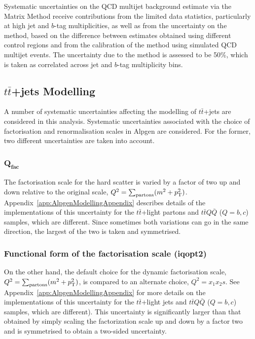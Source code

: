 Systematic uncertainties on the QCD multijet background 
estimate via the Matrix Method receive
contributions from the limited data statistics, 
particularly at high jet and $b$-tag multiplicities, as
well as from the uncertainty on the method, based on 
the difference between estimates obtained using 
different control regions and from the calibration 
of the method using simulated QCD multijet events.
The uncertainty due to the method is assessed to be 
50\%, which is taken as correlated across jet
and $b$-tag multiplicity bins. 




\subsection{$t\bar{t}$+jets Modelling}
\label{sec:syst_ttbarmodelHTX}

A number of systematic uncertainties affecting 
the modelling of $t\bar{t}$+jets are considered
in this analysis. Systematic uncertainties associated 
with the choice of factorisation and renormalisation 
scales in {\sc Alpgen} are considered. For the former, 
two different uncertainties are taken into account.
\subsubsection*{$\mathbf{Q_{fac}}$}
The factorisation scale for the hard scatter is varied by a factor of two up and down relative to the
original scale, $Q^2=\sum_{\rm partons} (m^2 + \pt^2)$.
\ifIsINT 
Appendix~\ref{app:AlpgenModellingAppendix} describes details of the
implementations of this uncertainty for the $t\bar{t}$+light partons and $t\bar{t}Q\bar{Q}$ ($Q=b,c$) samples, which are different.
\fi
Since sometimes both variations can go in the same direction, the largest of the two is taken and symmetrised.

\subsubsection*{Functional form of the factorisation scale (iqopt2)} 
On the other hand, the default choice for the dynamic factorisation scale,
$Q^2=\sum_{\rm partons} (m^2 + \pt^2)$,  is compared to an alternate choice, $Q^2=x_1 x_2 s$.
\ifIsINT
See Appendix~\ref{app:AlpgenModellingAppendix} for more details on the implementations of this uncertainty 
for the $t\bar{t}$+light jets and $t\bar{t}Q\bar{Q}$ ($Q=b,c$) samples, which are different).
\fi
This uncertainty is significantly larger than that obtained by simply scaling the factorization scale up and down by a factor two 
and is symmetrised to obtain a two-sided uncertainty.

